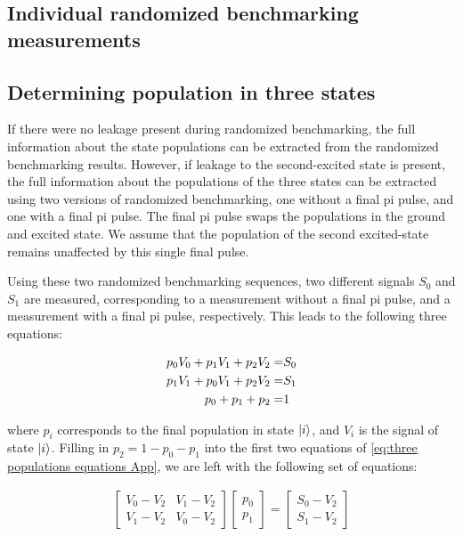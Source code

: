     \subsection{Individual randomized benchmarking measurements}
      \label{ssec:Individual randomized benchmarking measurements}

    \subsection{Determining population in three states}
      \label{ssec:Determining population in three states}
      If there were no leakage present during randomized benchmarking, the full information about the state populations can be extracted from the randomized benchmarking results. However, if leakage to the second-excited state is present, the full information about the populations of the three states can be extracted using two versions of randomized benchmarking, one without a final pi pulse, and one with a final pi pulse. The final pi pulse swaps the populations in the ground and excited state. We assume that the population of the second excited-state remains unaffected by this single final pulse.

      Using these two randomized benchmarking sequences, two different signals $S_0$ and $S_1$ are measured, corresponding to a measurement without a final pi pulse, and a measurement with a final pi pulse, respectively. This leads to the following three equations:

      \begin{align}
        p_0 V_0 + p_1 V_1 + p_2 V_2 = & S_0 \notag\\
        p_1 V_1 + p_0 V_1 + p_2 V_2 = & S_1 \notag\\
        p_0 + p_1 + p_2 = &   1
        \label{eq:three populations equations App}
      \end{align}

      where $p_i$ corresponds to the final population in state $\ket{i}$, and $V_i$ is the signal of state $\ket{i}$.  Filling in $p_2 = 1 - p_0 - p_1$ into the first two equations of \ref{eq:three populations equations App}, we are left with the following set of equations:

      \begin{align}
        \begin{bmatrix}
          V_0 - V_2 & V_1 - V_2 \\
          V_1 - V_2 & V_0 - V_2
        \end{bmatrix}
        \begin{bmatrix}
          p_0 \\
          p_1
        \end{bmatrix}
        =
        \begin{bmatrix}
          S_0 - V_2 \\
          S_1 - V_2
        \end{bmatrix}
      \end{align}

